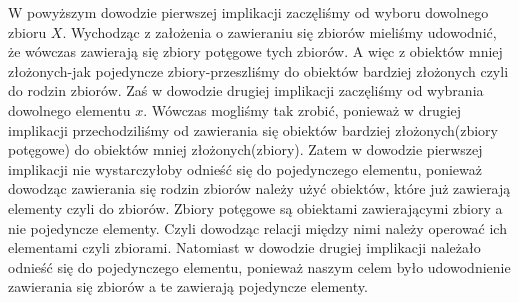 \begin{remark}
W powyższym dowodzie pierwszej implikacji zaczęliśmy od wyboru dowolnego zbioru $X$. Wychodząc z założenia o zawieraniu się zbiorów
mieliśmy udowodnić, że wówczas zawierają się zbiory potęgowe tych zbiorów. A więc z obiektów mniej złożonych-jak pojedyncze zbiory-przeszliśmy
do obiektów bardziej złożonych czyli do rodzin zbiorów. Zaś w dowodzie drugiej implikacji zaczęliśmy od wybrania dowolnego elementu $x$.
Wówczas mogliśmy tak zrobić, ponieważ w drugiej implikacji przechodziliśmy od zawierania się obiektów bardziej złożonych(zbiory potęgowe) do obiektów mniej 
złożonych(zbiory). Zatem w dowodzie pierwszej implikacji nie wystarczyłoby odnieść się do pojedynczego elementu, ponieważ dowodząc zawierania się
rodzin zbiorów należy użyć obiektów, które już zawierają elementy czyli do zbiorów. Zbiory potęgowe są obiektami zawierającymi zbiory a nie pojedyncze elementy.
Czyli dowodząc relacji między nimi należy operować ich elementami czyli zbiorami. Natomiast w dowodzie drugiej implikacji należało odnieść się do pojedynczego elementu, ponieważ
naszym celem było udowodnienie zawierania się zbiorów a te zawierają pojedyncze elementy.
\end{remark}